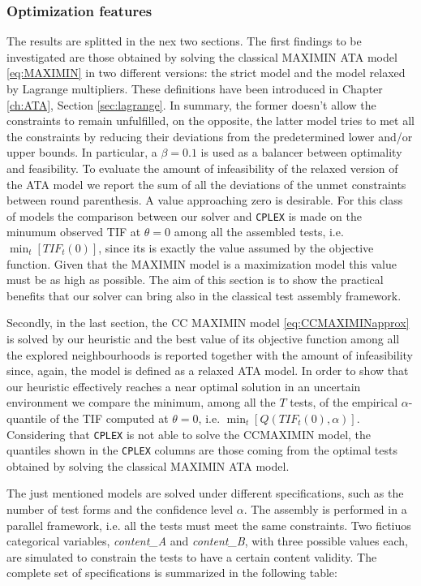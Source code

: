 \subsubsection{Optimization features}\label{sec:setopt}
The results are splitted in the nex two sections. The first findings to be investigated are those obtained by solving the classical MAXIMIN ATA model \eqref{eq:MAXIMIN} in two different versions: the strict model and the model relaxed by Lagrange multipliers. These definitions have been introduced in Chapter \ref{ch:ATA}, Section \ref{sec:lagrange}. In summary, the former doesn't allow the constraints to remain unfulfilled, on the opposite, the latter model tries to met all the constraints by reducing their deviations from the predetermined lower and/or upper bounds. In particular, a $\beta=0.1$ is used as a balancer between optimality and feasibility. To evaluate the amount of infeasibility of the relaxed version of the ATA model we report the sum of all the deviations of the unmet constraints between round parenthesis. A value approaching zero is desirable. For this class of models the comparison between our solver and \texttt{CPLEX} is made on the minumum observed TIF at $\theta=0$ among all the assembled tests, i.e. $\min_t\left[TIF_t(0)\right]$, since its is exactly the value assumed by the objective function. Given that the MAXIMIN model is a maximization model this value must be as high as possible. The aim of this section is to show the practical benefits that our solver can bring also in the classical test assembly framework.

Secondly, in the last section, the CC MAXIMIN model \eqref{eq:CCMAXIMINapprox} is solved by our heuristic and the best value of its objective function among all the explored neighbourhoods is reported together with the amount of infeasibility since, again, the model is defined as a relaxed ATA model. In order to show that our heuristic effectively reaches a near optimal solution in an uncertain environment we compare the minimum, among all the $T$ tests, of the empirical $\alpha$-quantile of the TIF computed at $\theta=0$, i.e.  $\min_t\left[Q(TIF_t(0),\alpha)\right]$. Considering that \texttt{CPLEX} is not able to solve the CCMAXIMIN model, the quantiles shown in the \texttt{CPLEX} columns are those coming from the optimal tests obtained by solving the classical MAXIMIN ATA model.

The just mentioned models are solved under different specifications, such as the number of test forms and the confidence level $\alpha$. The assembly is performed in a parallel framework, i.e. all the tests must meet the same constraints. Two fictiuos categorical variables, \emph{content\_A} and \emph{content\_B}, with three possible values each, are simulated to constrain the tests to have a certain content validity. The complete set of specifications is summarized in the following table:

